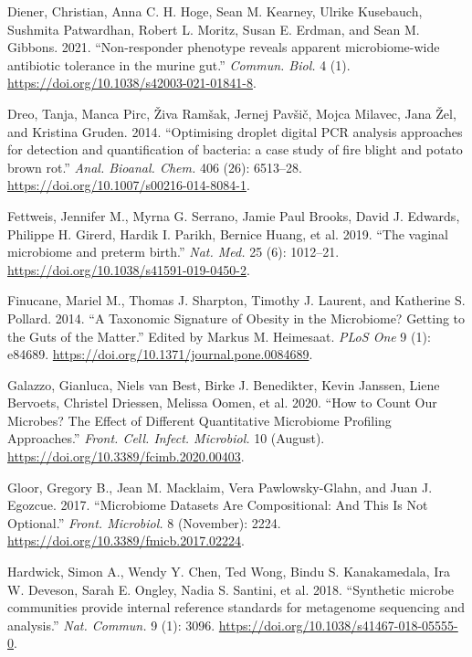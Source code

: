 \documentclass[
]{article}
\newlength{\cslhangindent}
\newlength{\cslentryspacingunit} %
\newenvironment{CSLReferences}[2] %
 {%
  \setlength{\parindent}{0pt}
  \ifodd #1
  \let\oldpar\par
  \def\par{\hangindent=\cslhangindent\oldpar}
  \fi
  \setlength{\parskip}{#2\cslentryspacingunit}
 }%
 {}
\begin{document}
\begin{CSLReferences}{1}{0}
\leavevmode{}%
Diener, Christian, Anna C. H. Hoge, Sean M. Kearney, Ulrike Kusebauch, Sushmita Patwardhan, Robert L. Moritz, Susan E. Erdman, and Sean M. Gibbons. 2021. {``{Non-responder phenotype reveals apparent microbiome-wide antibiotic tolerance in the murine gut}.''} \emph{Commun. Biol.} 4 (1). \url{https://doi.org/10.1038/s42003-021-01841-8}.

\leavevmode{}%
Dreo, Tanja, Manca Pirc, Živa Ramšak, Jernej Pavšič, Mojca Milavec, Jana Žel, and Kristina Gruden. 2014. {``{Optimising droplet digital PCR analysis approaches for detection and quantification of bacteria: a case study of fire blight and potato brown rot}.''} \emph{Anal. Bioanal. Chem.} 406 (26): 6513--28. \url{https://doi.org/10.1007/s00216-014-8084-1}.

\leavevmode{}%
Fettweis, Jennifer M., Myrna G. Serrano, Jamie Paul Brooks, David J. Edwards, Philippe H. Girerd, Hardik I. Parikh, Bernice Huang, et al. 2019. {``{The vaginal microbiome and preterm birth}.''} \emph{Nat. Med.} 25 (6): 1012--21. \url{https://doi.org/10.1038/s41591-019-0450-2}.

\leavevmode{}%
Finucane, Mariel M., Thomas J. Sharpton, Timothy J. Laurent, and Katherine S. Pollard. 2014. {``{A Taxonomic Signature of Obesity in the Microbiome? Getting to the Guts of the Matter}.''} Edited by Markus M. Heimesaat. \emph{PLoS One} 9 (1): e84689. \url{https://doi.org/10.1371/journal.pone.0084689}.

\leavevmode{}%
Galazzo, Gianluca, Niels van Best, Birke J. Benedikter, Kevin Janssen, Liene Bervoets, Christel Driessen, Melissa Oomen, et al. 2020. {``{How to Count Our Microbes? The Effect of Different Quantitative Microbiome Profiling Approaches}.''} \emph{Front. Cell. Infect. Microbiol.} 10 (August). \url{https://doi.org/10.3389/fcimb.2020.00403}.

\leavevmode{}%
Gloor, Gregory B., Jean M. Macklaim, Vera Pawlowsky-Glahn, and Juan J. Egozcue. 2017. {``{Microbiome Datasets Are Compositional: And This Is Not Optional}.''} \emph{Front. Microbiol.} 8 (November): 2224. \url{https://doi.org/10.3389/fmicb.2017.02224}.

\leavevmode{}%
Hardwick, Simon A., Wendy Y. Chen, Ted Wong, Bindu S. Kanakamedala, Ira W. Deveson, Sarah E. Ongley, Nadia S. Santini, et al. 2018. {``{Synthetic microbe communities provide internal reference standards for metagenome sequencing and analysis}.''} \emph{Nat. Commun.} 9 (1): 3096. \url{https://doi.org/10.1038/s41467-018-05555-0}.


\end{CSLReferences}
\end{document}
